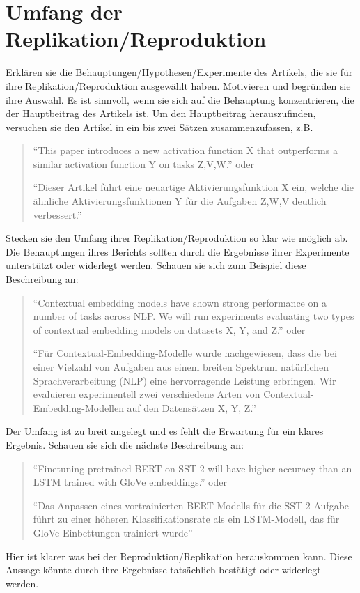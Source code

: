 \documentclass[DIV=13,fontsize=11pt]{scrartcl}
\begin{document}
\section{Umfang der Replikation/Reproduktion}
Erklären sie die Behauptungen/Hypothesen/Experimente des Artikels, die sie für ihre Replikation/Reproduktion ausgewählt haben.
Motivieren und begründen sie ihre Auswahl.
Es ist sinnvoll, wenn sie sich auf die Behauptung konzentrieren, die der Hauptbeitrag des Artikels ist.
Um den Hauptbeitrag herauszufinden, versuchen sie den Artikel in ein bis zwei Sätzen zusammenzufassen, z.B.
\begin{quote}
    ``This paper introduces a new activation function X that outperforms a similar activation function Y on tasks Z,V,W.''  oder

    ``Dieser Artikel führt eine neuartige Aktivierungsfunktion X ein, welche die ähnliche Aktivierungsfunktionen Y für die Aufgaben Z,W,V deutlich verbessert.''
\end{quote}
Stecken sie den Umfang ihrer Replikation/Reproduktion so klar wie möglich ab.
Die Behauptungen ihres Berichts sollten durch die Ergebnisse ihrer Experimente unterstützt oder widerlegt werden.
Schauen sie sich zum Beispiel diese Beschreibung an:
\begin{quote}
    ``Contextual embedding models have shown strong performance on a number of tasks across NLP. We will run experiments evaluating two types of contextual embedding models on datasets X, Y, and Z.'' oder

    ``Für Contextual-Embedding-Modelle wurde nachgewiesen, dass die bei einer Vielzahl von Aufgaben aus einem breiten Spektrum natürlichen Sprachverarbeitung (NLP) eine hervorragende Leistung erbringen. Wir evaluieren experimentell zwei verschiedene Arten von Contextual-Embedding-Modellen auf den Datensätzen X, Y, Z.''
\end{quote}
Der Umfang ist zu breit angelegt und es fehlt die Erwartung für ein klares Ergebnis.
Schauen sie sich die nächste Beschreibung an:
\begin{quote}
    ``Finetuning pretrained BERT on SST-2 will have higher accuracy than an LSTM trained with GloVe embeddings.'' oder

    ``Das Anpassen eines vortrainierten BERT-Modells für die SST-2-Aufgabe führt zu einer höheren Klassifikationsrate als ein LSTM-Modell, das für GloVe-Einbettungen trainiert wurde''
\end{quote}
Hier ist klarer was bei der Reproduktion/Replikation herauskommen kann. Diese Aussage könnte durch ihre Ergebnisse tatsächlich bestätigt oder widerlegt werden.
\end{document}
